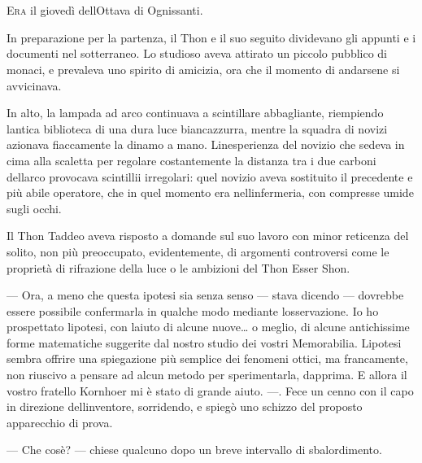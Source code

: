 	\chapter{\phantom{text}}

\lettrine{E}{ra} il giovedì dell\textquotesingle Ottava di Ognissanti.

In preparazione per la partenza, il Thon e il suo seguito dividevano gli
appunti e i documenti nel sotterraneo. Lo studioso aveva attirato un
piccolo pubblico di monaci, e prevaleva uno spirito di amicizia, ora che
il momento di andarsene si avvicinava.

In alto, la lampada ad arco continuava a scintillare abbagliante,
riempiendo l\textquotesingle antica biblioteca di una dura luce
biancazzurra, mentre la squadra di novizi azionava fiaccamente la dinamo
a mano. L\textquotesingle inesperienza del novizio che sedeva in cima
alla scaletta per regolare costantemente la distanza tra i due carboni
dell\textquotesingle arco provocava scintillii irregolari: quel novizio
aveva sostituito il precedente e più abile operatore, che in quel
momento era nell\textquotesingle infermeria, con compresse umide sugli
occhi.

Il Thon Taddeo aveva risposto a domande sul suo lavoro con minor
reticenza del solito, non più preoccupato, evidentemente, di argomenti
controversi come le proprietà di rifrazione della luce o le ambizioni
del Thon Esser Shon.

--- Ora, a meno che questa ipotesi sia senza senso --- stava dicendo ---
dovrebbe essere possibile confermarla in qualche modo mediante
l\textquotesingle osservazione. Io ho prospettato
l\textquotesingle ipotesi, con l\textquotesingle aiuto di alcune
nuove\ldots{} o meglio, di alcune antichissime forme matematiche
suggerite dal nostro studio dei vostri Memorabilia.
L\textquotesingle ipotesi sembra offrire una spiegazione più semplice
dei fenomeni ottici, ma francamente, non riuscivo a pensare ad alcun
metodo per sperimentarla, dapprima. E allora il vostro fratello Kornhoer
mi è stato di grande aiuto. ---. Fece un cenno con il capo in direzione
dell\textquotesingle inventore, sorridendo, e spiegò uno schizzo del
proposto apparecchio di prova.

--- Che cos\textquotesingle è? --- chiese qualcuno dopo un breve
intervallo di sbalordimento.

